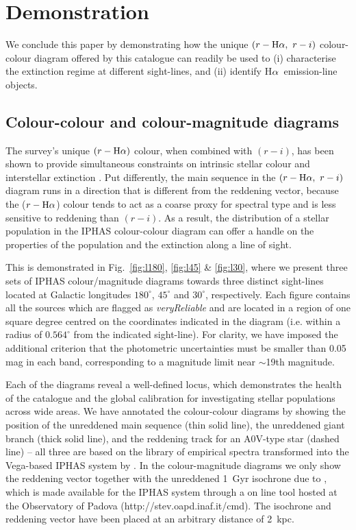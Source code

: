\documentclass[useAMS,usenatbib]{mn2e}
\def\ha{\mbox{H$\rm \alpha$}}
\begin{document}
\section{Demonstration}
\label{sec:demonstration}

We conclude this paper by demonstrating how the unique
$(r-\ha,\ r-i)$ colour-colour diagram offered by this catalogue
can readily be used to
(i) characterise the extinction regime at different sight-lines, and
(ii) identify \ha\ emission-line objects.

\subsection{Colour-colour and colour-magnitude diagrams}

The survey's unique $(r-\ha)$ colour,
when combined with $(r-i)$,
has been shown to provide simultaneous constraints 
on intrinsic stellar colour and interstellar extinction \citep{Drew2008}. 
Put differently, the main sequence in the $(r-\ha,\ r-i)$ diagram
runs in a direction that is different from the reddening vector,
because the ($r-\ha$) colour tends to act
as a coarse proxy for spectral type
and is less sensitive to reddening than $(r-i)$.
As a result, the distribution of a stellar population
in the IPHAS colour-colour diagram
can offer a handle on the properties of the population
and the extinction along a line of sight.

This is demonstrated 
in Fig.~\ref{fig:l180}, \ref{fig:l45} \& \ref{fig:l30},
where we present three sets of IPHAS colour/magnitude diagrams
towards three distinct sight-lines
located at Galactic longitudes 
$180^\circ$, $45^\circ$ and $30^\circ$, respectively.
Each figure contains all the sources
which are flagged as \emph{veryReliable}
and are located in a region of one square degree 
centred on the coordinates indicated in the diagram
(i.e. within a radius of $0.564^\circ$ from the indicated sight-line).
For clarity, we have imposed the additional criterion
that the photometric uncertainties
must be smaller than 0.05 mag in each band,
corresponding to a magnitude limit near $\sim$19th magnitude.

Each of the diagrams reveal a well-defined locus,
which demonstrates the health of the catalogue and the global calibration
for investigating stellar populations across wide areas.
We have annotated the colour-colour diagrams
by showing the position 
of the unreddened main sequence (thin solid line),
the unreddened giant branch (thick solid line),
and the reddening track for an A0V-type star (dashed line)
-- all three are based on the \cite{Pickles1998} library 
of empirical spectra
transformed into the Vega-based IPHAS system by \cite{Drew2005}.
In the colour-magnitude diagrams we only show the reddening vector
together with the unreddened 1~Gyr isochrone due to \cite{Bressan2012},
which is made available for the IPHAS system through a
on line tool hosted at the Observatory of Padova
(http://stev.oapd.inaf.it/cmd).
The isochrone and reddening vector have been placed
at an arbitrary distance of 2~kpc.
\end{document}
